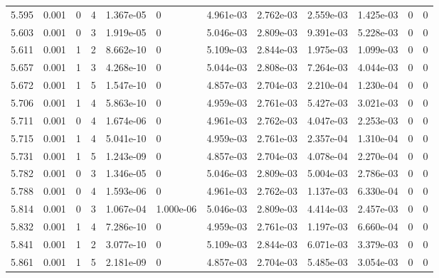 \documentclass[preview]{standalone}
\begin{document}
{{{{{{{\begin{tabular}{L{1.2cm}C{1.2cm} C{0.3cm}C{0.5cm} C{1.4cm}C{1.4cm} C{1.4cm}C{1.4cm} C{1.6cm}C{1.6cm} C{1.6cm}C{1.6cm}}
  5.595  &  0.001  & 0     &  4 &  1.367e-05  & 0  &  4.961e-03&   2.762e-03& 2.559e-03 & 1.425e-03   &  0 & 0  \\ 
  5.603  &  0.001  & 0     &  3 &  1.919e-05  & 0  &  5.046e-03&   2.809e-03& 9.391e-03 & 5.228e-03   &  0 & 0  \\ 
  5.611  &  0.001  & 1     &  2 &  8.662e-10  & 0  &  5.109e-03&   2.844e-03& 1.975e-03 & 1.099e-03   &  0 & 0  \\ 
  5.657  &  0.001  & 1     &  3 &  4.268e-10  & 0  &  5.044e-03&   2.808e-03& 7.264e-03 & 4.044e-03   &  0 & 0  \\ 
  5.672  &  0.001  & 1     &  5 &  1.547e-10  & 0  &  4.857e-03&   2.704e-03& 2.210e-04 & 1.230e-04   &  0 & 0  \\ 
  5.706  &  0.001  & 1     &  4 &  5.863e-10  & 0  &  4.959e-03&   2.761e-03& 5.427e-03 & 3.021e-03   &  0 & 0  \\ 
  5.711  &  0.001  & 0     &  4 &  1.674e-06  & 0  &  4.961e-03&   2.762e-03& 4.047e-03 & 2.253e-03   &  0 & 0  \\ 
  5.715  &  0.001  & 1     &  4 &  5.041e-10  & 0  &  4.959e-03&   2.761e-03& 2.357e-04 & 1.310e-04   &  0 & 0  \\ 
  5.731  &  0.001  & 1     &  5 &  1.243e-09  & 0  &  4.857e-03&   2.704e-03& 4.078e-04 & 2.270e-04   &  0 & 0  \\ 
  5.782  &  0.001  & 0     &  3 &  1.346e-05  & 0  &  5.046e-03&   2.809e-03& 5.004e-03 & 2.786e-03   &  0 & 0  \\ 
  5.788  &  0.001  & 0     &  4 &  1.593e-06  & 0  &  4.961e-03&   2.762e-03& 1.137e-03 & 6.330e-04   &  0 & 0  \\ 
  5.814  &  0.001  & 0     &  3 &  1.067e-04  & 1.000e-06  &  5.046e-03&   2.809e-03& 4.414e-03 & 2.457e-03   &  0 & 0  \\ 
  5.832  &  0.001  & 1     &  4 &  7.286e-10  & 0  &  4.959e-03&   2.761e-03& 1.197e-03 & 6.660e-04   &  0 & 0  \\ 
  5.841  &  0.001  & 1     &  2 &  3.077e-10  & 0  &  5.109e-03&   2.844e-03& 6.071e-03 & 3.379e-03   &  0 & 0  \\ 
  5.861  &  0.001  & 1     &  5 &  2.181e-09  & 0  &  4.857e-03&   2.704e-03& 5.485e-03 & 3.054e-03   &  0 & 0  \\ 
\hline 
\end{tabular} 

}}}}}}}
\end{document}
